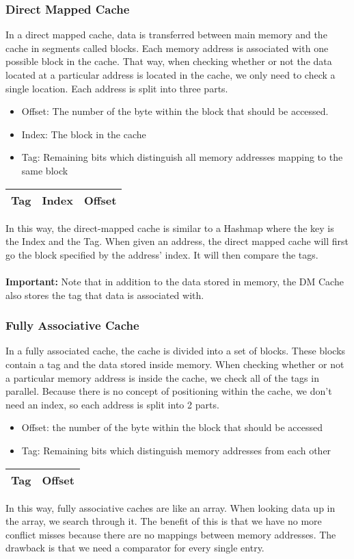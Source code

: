 \documentclass{article}
\begin{document}
\subsubsection{Direct Mapped Cache}
In a direct mapped cache, data is transferred between main memory and the cache in segments called blocks. Each memory address is associated with one possible block in the cache. That way, when checking whether or not the data located at a particular address
is located in the cache, we only need to check a single location. Each address is split into three parts.
\begin{itemize}
    \item Offset: The number of the byte within the block that should be accessed.
    \item Index: The block in the cache
    \item Tag: Remaining bits which distinguish all memory addresses mapping to the same block
\end{itemize}
\begin{center}
    \begin{tabular}{|c|c|c|}
        \hline
        Tag & Index & Offset\\
        \hline
    \end{tabular}
\end{center}
In this way, the direct-mapped cache is similar to a Hashmap where the key is the Index and the Tag.
When given an address, the direct mapped cache will first go the block specified by the address' index. It will then compare the tags.\\\\
\textbf{Important: } Note that in addition to the data stored in memory, the DM Cache also stores the tag that data is associated with.
\subsubsection{Fully Associative Cache}
In a fully associated cache, the cache is divided into a set of blocks. These blocks contain a tag and the data stored inside memory. When checking whether or not
a particular memory address is inside the cache, we check all of the tags in parallel. Because there is no concept of positioning within the cache, we don't need an index,
so each address is split into 2 parts.
\begin{itemize}
    \item Offset: the number of the byte within the block that should be accessed
    \item Tag: Remaining bits which distinguish memory addresses from each other
\end{itemize}
\begin{center}
    \begin{tabular}{|c|c|}
        \hline
        Tag & Offset\\
        \hline
    \end{tabular}
\end{center}
In this way, fully associative caches are like an array. When looking data up in the array, we search through it.
The benefit of this is that we have no more conflict misses because there are no mappings between memory addresses. The drawback
is that we need a comparator for every single entry.
\end{document}
